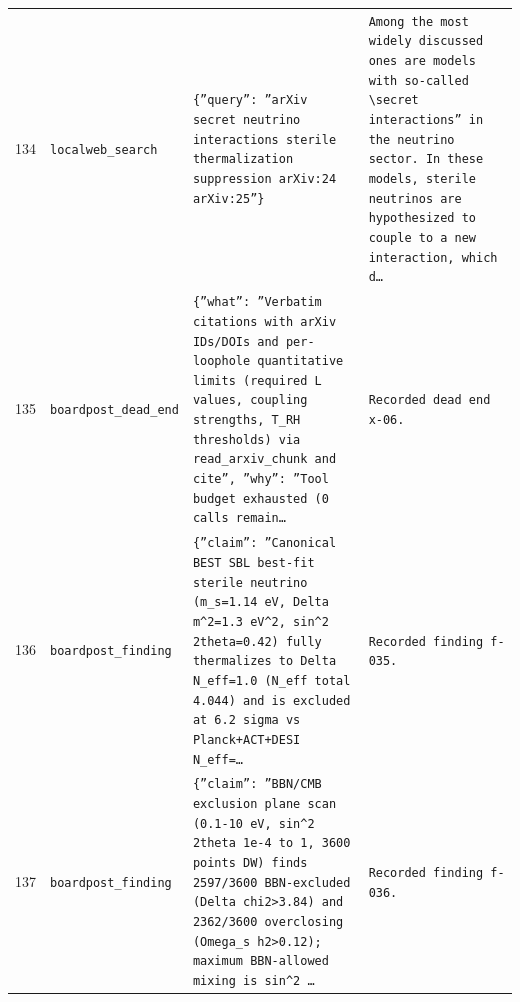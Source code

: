 \documentclass[11pt,a4paper]{article}
\begin{document}
\begin{longtable}{@{}p{}p{}p{}p{}@{}}
134 & \texttt{local}\newline\texttt{web\_\allowbreak{}search} & \texttt{\{''query'':\allowbreak{} ''arXiv secret neutrino interactions sterile thermalization suppression arXiv:\allowbreak{}24 arXiv:\allowbreak{}25''\}\allowbreak{}} & \texttt{Among the most widely discussed ones are models with so-called \textbackslash{}\allowbreak{}secret interactions'' in the neutrino sector. In these models,\allowbreak{} sterile neutrinos are hypothesized to couple to a new interaction,\allowbreak{} which d\ldots{}\allowbreak{}} \\
135 & \texttt{board}\newline\texttt{post\_\allowbreak{}dead\_\allowbreak{}end} & \texttt{\{''what'':\allowbreak{} ''Verbatim citations with arXiv IDs/\allowbreak{}DOIs and per-loophole quantitative limits (required L values,\allowbreak{} coupling strengths,\allowbreak{} T\_\allowbreak{}RH thresholds)\allowbreak{} via read\_\allowbreak{}arxiv\_\allowbreak{}chunk and cite'',\allowbreak{} ''why'':\allowbreak{} ''Tool budget exhausted (0 calls remain\ldots{}\allowbreak{}} & \texttt{Recorded dead end x-06.} \\
136 & \texttt{board}\newline\texttt{post\_\allowbreak{}finding} & \texttt{\{''claim'':\allowbreak{} ''Canonical BEST SBL best-fit sterile neutrino (m\_\allowbreak{}s=\allowbreak{}1.14 eV,\allowbreak{} Delta m\textasciicircum{}\allowbreak{}2=\allowbreak{}1.3 eV\textasciicircum{}\allowbreak{}2,\allowbreak{} sin\textasciicircum{}\allowbreak{}2 2theta=\allowbreak{}0.42)\allowbreak{} fully thermalizes to Delta N\_\allowbreak{}eff=\allowbreak{}1.0 (N\_\allowbreak{}eff total 4.044)\allowbreak{} and is excluded at 6.2 sigma vs Planck+ACT+DESI N\_\allowbreak{}eff=\allowbreak{}\ldots{}\allowbreak{}} & \texttt{Recorded finding f-035.} \\
137 & \texttt{board}\newline\texttt{post\_\allowbreak{}finding} & \texttt{\{''claim'':\allowbreak{} ''BBN/\allowbreak{}CMB exclusion plane scan (0.1-10 eV,\allowbreak{} sin\textasciicircum{}\allowbreak{}2 2theta 1e-4 to 1,\allowbreak{} 3600 points DW)\allowbreak{} finds 2597/\allowbreak{}3600 BBN-excluded (Delta chi2\textgreater{}\allowbreak{}3.84)\allowbreak{} and 2362/\allowbreak{}3600 overclosing (Omega\_\allowbreak{}s h2\textgreater{}\allowbreak{}0.12)\allowbreak{};\allowbreak{} maximum BBN-allowed mixing is sin\textasciicircum{}\allowbreak{}2 \ldots{}\allowbreak{}} & \texttt{Recorded finding f-036.} \\

\end{longtable}
\end{document}
